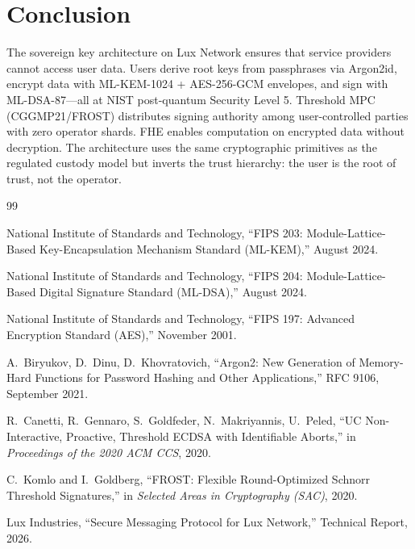 \section{Conclusion}


The sovereign key architecture on Lux Network ensures that service providers
cannot access user data.  Users derive root keys from passphrases via
Argon2id, encrypt data with ML-KEM-1024 + AES-256-GCM envelopes, and
sign with ML-DSA-87---all at NIST post-quantum Security Level 5.
Threshold MPC (CGGMP21/FROST) distributes signing authority among
user-controlled parties with zero operator shards.  FHE enables
computation on encrypted data without decryption.  The architecture
uses the same cryptographic primitives as the regulated custody model
but inverts the trust hierarchy: the user is the root of trust, not
the operator.

\begin{thebibliography}{99}

  National Institute of Standards and Technology,
  ``FIPS 203: Module-Lattice-Based Key-Encapsulation Mechanism Standard (ML-KEM),''
  August 2024.

  National Institute of Standards and Technology,
  ``FIPS 204: Module-Lattice-Based Digital Signature Standard (ML-DSA),''
  August 2024.

  National Institute of Standards and Technology,
  ``FIPS 197: Advanced Encryption Standard (AES),''
  November 2001.

  A.~Biryukov, D.~Dinu, D.~Khovratovich,
  ``Argon2: New Generation of Memory-Hard Functions for Password Hashing and Other Applications,''
  RFC 9106, September 2021.

  R.~Canetti, R.~Gennaro, S.~Goldfeder, N.~Makriyannis, U.~Peled,
  ``UC Non-Interactive, Proactive, Threshold ECDSA with Identifiable Aborts,''
  in \emph{Proceedings of the 2020 ACM CCS}, 2020.

  C.~Komlo and I.~Goldberg,
  ``FROST: Flexible Round-Optimized Schnorr Threshold Signatures,''
  in \emph{Selected Areas in Cryptography (SAC)}, 2020.

  Lux Industries,
  ``Secure Messaging Protocol for Lux Network,''
  Technical Report, 2026.

\end{thebibliography}

